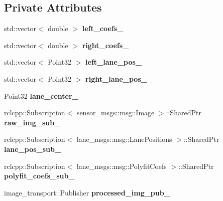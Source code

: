 \subsection*{Private Attributes}
\begin{DoxyCompactItemize}
\item 
\mbox{\label{classLaneVisualizationNode_a268dac1df1b6c937091db71f441f0e5c}} 
std\+::vector$<$ double $>$ {\bfseries left\+\_\+coefs\+\_\+}
\item 
\mbox{\label{classLaneVisualizationNode_ae25334f837d5d7af1f757d531dfd0686}} 
std\+::vector$<$ double $>$ {\bfseries right\+\_\+coefs\+\_\+}
\item 
\mbox{\label{classLaneVisualizationNode_ad26b5a0a84fc70c42d96e5246e65d41e}} 
std\+::vector$<$ Point32 $>$ {\bfseries left\+\_\+lane\+\_\+pos\+\_\+}
\item 
\mbox{\label{classLaneVisualizationNode_ab0d648873fb5260b77f5198875dceeab}} 
std\+::vector$<$ Point32 $>$ {\bfseries right\+\_\+lane\+\_\+pos\+\_\+}
\item 
\mbox{\label{classLaneVisualizationNode_a1770f42de616c7fb867ce19d3e495201}} 
Point32 {\bfseries lane\+\_\+center\+\_\+}
\item 
\mbox{\label{classLaneVisualizationNode_ab6687133edfd3067fea8c7aec91f97bc}} 
rclcpp\+::\+Subscription$<$ sensor\+\_\+msgs\+::msg\+::\+Image $>$\+::Shared\+Ptr {\bfseries raw\+\_\+img\+\_\+sub\+\_\+}
\item 
\mbox{\label{classLaneVisualizationNode_ae2e8d02bfc45db689c05c130f2ae65bd}} 
rclcpp\+::\+Subscription$<$ lane\+\_\+msgs\+::msg\+::\+Lane\+Positions $>$\+::Shared\+Ptr {\bfseries lane\+\_\+pos\+\_\+sub\+\_\+}
\item 
\mbox{\label{classLaneVisualizationNode_a42495fb3f3a4e1a7da23a3baa7a0b709}} 
rclcpp\+::\+Subscription$<$ lane\+\_\+msgs\+::msg\+::\+Polyfit\+Coefs $>$\+::Shared\+Ptr {\bfseries polyfit\+\_\+coefs\+\_\+sub\+\_\+}
\item 
\mbox{\label{classLaneVisualizationNode_aaf4b2b01423616d3333f3c69915c736f}} 
image\+\_\+transport\+::\+Publisher {\bfseries processed\+\_\+img\+\_\+pub\+\_\+}
\end{DoxyCompactItemize}


